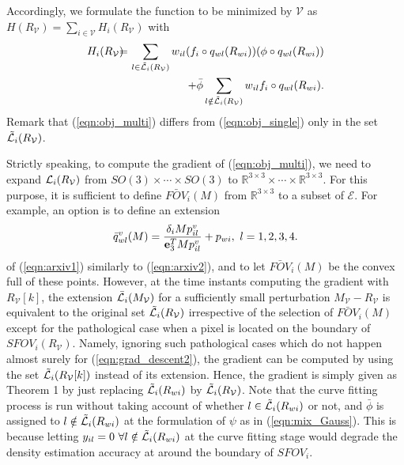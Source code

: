 \documentclass[conference,letterpaper]{ieeeconf}
\newcommand{\V}{{\mathcal V}}
\newcommand{\E}{{\mathcal E}}
\newcommand{\R}{{\mathbb R}}
\newcommand{\ewi}{R_{wi}}
\renewcommand{\L}{{\cal L}}
\begin{document}
Accordingly, we formulate the  function
to be minimized by $\V$ as $H(R_{\V}) = 
\sum_{i\in \V} H_i(R_{\V})$ with
\begin{eqnarray}
H_i(R_{\V}) \!\!&\!\!=\!\!&\!\! 
\sum_{l \in \tilde \L_i(R_{\V})} w_{il} (f_i\circ q_{wl}(\ewi)) (\phi \circ q_{wl}(\ewi))
\nonumber\\
&&\hspace{1cm} + \bar{\phi} \sum_{l \notin \tilde \L_i(R_{\V})} w_{il} f_i\circ q_{wl}(\ewi).
\label{eqn:obj_multi}
\end{eqnarray}
Remark that (\ref{eqn:obj_multi}) differs from
(\ref{eqn:obj_single}) only in the set $\tilde \L_i(R_{\V})$.



Strictly speaking, to compute the gradient of (\ref{eqn:obj_multi}),
we need to expand $\L_i(R_{\V})$ from $SO(3)\times \cdots \times SO(3)$ to 
$\R^{3\times 3}\times \cdots \times \R^{3\times 3}$. 
For this purpose, it is sufficient to define 
$\bar{FOV}_i(M)$ from $\R^{3\times 3}$ to a subset of $\E$.
For example, an option is to define 
an extension
\begin{equation}
\bar q^v_{wl}(M) = 
\frac{\delta_i M p^v_{il}}{{\bf e}_3^T M p^v_{il}} + p_{wi},\ l=1,2,3,4.
\label{eqn:arxiv3}
\end{equation}
of (\ref{eqn:arxiv1}) similarly to (\ref{eqn:arxiv2}), and
to let $\bar{FOV}_i(M)$ be the convex full of these points.
However, at the time instants computing the gradient with $R_{\V}[k]$,
the extension $\bar \L_i(M_{\V})$ for a sufficiently small
perturbation $M_{\V}-R_{\V}$ is equivalent to
the original set $\tilde \L_i(R_{\V})$
irrespective of the selection of $\bar{FOV}_i(M)$
except for the pathological case when a pixel is located on the boundary
of $SFOV_i(R_{\V})$.
Namely, ignoring such pathological cases which do not happen
almost surely for (\ref{eqn:grad_descent2}),
the gradient can be computed by using 
the set $\tilde \L_i(R_{\V}[k])$ instead of its extension.
Hence, the gradient is simply given as Theorem 1
by just replacing $\tilde \L_i(\ewi)$ by $\tilde \L_i(R_{\V})$.
Note that the curve fitting process is run without 
taking account of whether $l\in \tilde \L_i(\ewi)$ or not, 
and $\bar{\phi}$ is assigned
to $l\notin \tilde \L_i(\ewi)$ 
at the formulation of $\psi$ as in (\ref{eqn:mix_Gauss}).
This is because letting
$y_{il} = 0\ {\forall l} \notin \tilde \L_i(\ewi)$
at the curve fitting stage would degrade the density estimation
accuracy at around the boundary of $SFOV_i$. 
\end{document}
